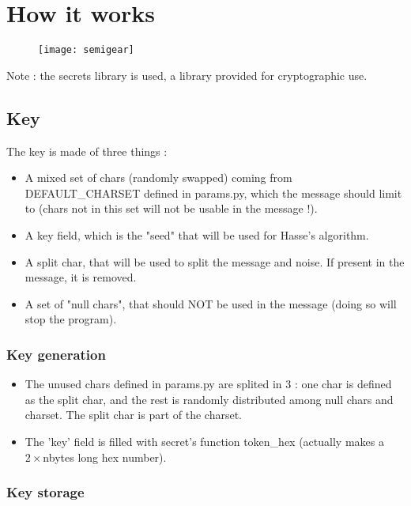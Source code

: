 \section{How it works}

\begin{figure}[H]
    \centering
    \texttt{[image: semigear]}
\end{figure}

Note : the secrets library is used, a library provided for cryptographic use.

\subsection{Key}

The key is made of three things :
\begin{itemize}
    \item A mixed set of chars (randomly swapped) coming from DEFAULT\_CHARSET defined in params.py, which the message should limit to 
          (chars not in this set will not be usable in the message !).
    \item A key field, which is the "seed" that will be used for Hasse's algorithm.
    \item A split char, that will be used to split the message and noise. If present in the message, it is removed.
    \item A set of "null chars", that should NOT be used in the message (doing so will stop the program).
\end{itemize}

\subsubsection{Key generation}

\begin{itemize}
    \item The unused chars defined in params.py are splited in 3 : one char is defined as the split char, and the rest is randomly 
          distributed among null chars and charset. The split char is part of the charset.
    \item The 'key' field is filled with secret's function token\_hex (actually makes a $2 \times$nbytes long hex number).
\end{itemize}

\subsubsection{Key storage}

